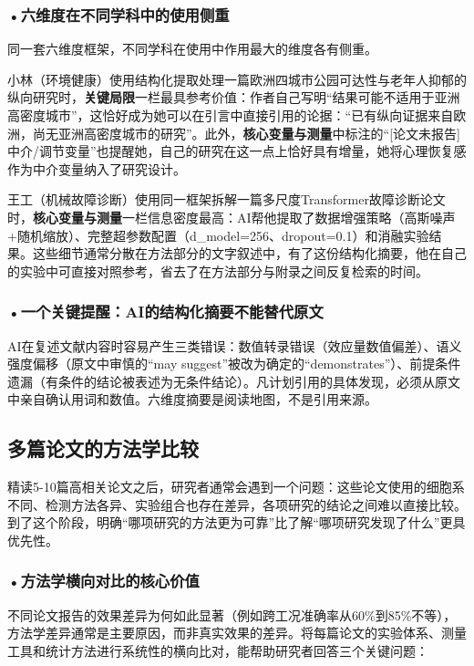 \smallskip
\subsubsection*{\textbf{•六维度在不同学科中的使用侧重}}同一套六维度框架，不同学科在使用中作用最大的维度各有侧重。

小林（环境健康）使用结构化提取处理一篇欧洲四城市公园可达性与老年人抑郁的纵向研究时，\textbf{关键局限}一栏最具参考价值：作者自己写明``结果可能不适用于亚洲高密度城市''，这恰好成为她可以在引言中直接引用的论据：``已有纵向证据来自欧洲，尚无亚洲高密度城市的研究''。此外，\textbf{核心变量与测量}中标注的``[论文未报告]中介/调节变量''也提醒她，自己的研究在这一点上恰好具有增量，她将心理恢复感作为中介变量纳入了研究设计。

王工（机械故障诊断）使用同一框架拆解一篇多尺度Transformer故障诊断论文时，\textbf{核心变量与测量}一栏信息密度最高：AI帮他提取了数据增强策略（高斯噪声+随机缩放）、完整超参数配置（d\_model=256、dropout=0.1）和消融实验结果。这些细节通常分散在方法部分的文字叙述中，有了这份结构化摘要，他在自己的实验中可直接对照参考，省去了在方法部分与附录之间反复检索的时间。

\subsubsection*{\textbf{•一个关键提醒：AI的结构化摘要不能替代原文}}AI在复述文献内容时容易产生三类错误：数值转录错误（效应量数值偏差）、语义强度偏移（原文中审慎的``may suggest''被改为确定的``demonstrates''）、前提条件遗漏（有条件的结论被表述为无条件结论）。凡计划引用的具体发现，必须从原文中亲自确认用词和数值。六维度摘要是阅读地图，不是引用来源。


\subsection{多篇论文的方法学比较}

精读5-10篇高相关论文之后，研究者通常会遇到一个问题：这些论文使用的细胞系不同、检测方法各异、实验组合也存在差异，各项研究的结论之间难以直接比较。到了这个阶段，明确``哪项研究的方法更为可靠''比了解``哪项研究发现了什么''更具优先性。

\subsubsection*{\textbf{•方法学横向对比的核心价值}}不同论文报告的效果差异为何如此显著（例如跨工况准确率从60\%到85\%不等），方法学差异通常是主要原因，而非真实效果的差异。将每篇论文的实验体系、测量工具和统计方法进行系统性的横向比对，能帮助研究者回答三个关键问题：

